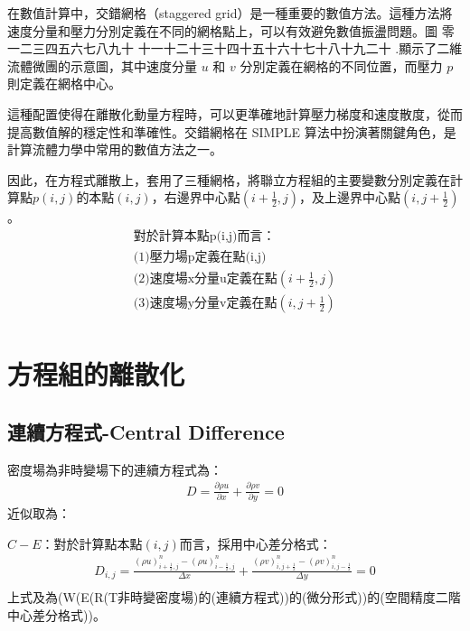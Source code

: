 \documentclass[12pt]{article}
\newcommand{\chinese}[1]{%
  \ifcase#1 零\or 一\or 二\or 三\or 四\or 五\or 六\or 七\or 八\or 九\or 十\or
  十一\or 十二\or 十三\or 十四\or 十五\or 十六\or 十七\or 十八\or 十九\or 二十\fi
}
\renewcommand{\thefigure}{\chinese{\value{section}}.\arabic{figure}}
\begin{document}
在數值計算中，交錯網格（staggered grid）是一種重要的數值方法。這種方法將速度分量和壓力分別定義在不同的網格點上，可以有效避免數值振盪問題。圖\thefigure 顯示了二維流體微團的示意圖，其中速度分量 $u$ 和 $v$ 分別定義在網格的不同位置，而壓力 $p$ 則定義在網格中心。

這種配置使得在離散化動量方程時，可以更準確地計算壓力梯度和速度散度，從而提高數值解的穩定性和準確性。交錯網格在 SIMPLE 算法中扮演著關鍵角色，是計算流體力學中常用的數值方法之一。

\noindent 因此，在方程式離散上，套用了三種網格，將聯立方程組的主要變數分別定義在計算點$p(i,j)$的本點$(i,j)$，右邊界中心點$(i+\frac{1}{2},j)$，及上邊界中心點$(i,j+\frac{1}{2})$。
\[
\begin{array}{l}
    \text{對於計算本點p(i,j)而言：}\\[1.5ex]
    \text{(1)壓力場p定義在點(i,j)}\\[1.5ex]
    \text{(2)速度場x分量u定義在點$(i+\frac{1}{2},j)$}\\[1.5ex]
    \text{(3)速度場y分量v定義在點$(i,j+\frac{1}{2})$}\\[1.5ex]
\end{array}
\]
\section{方程組的離散化}
\subsection{連續方程式-Central Difference}
\noindent 密度場為非時變場下的連續方程式為：
\begin{equation}\begin{split}
    D = \frac{\partial \rho u }{\partial x} + \frac{\partial\rho v }{\partial y} = 0
\end{split}\end{equation}
\noindent 近似取為：

\noindent $C-E$：對於計算點本點$(i,j)$而言，採用中心差分格式：
\begin{equation}\begin{split}
    D_{i,j} = \frac{(\rho u)_{i+\frac{1}{2},j}^{n} - (\rho u)_{i-\frac{1}{2},j}^{n}}{\Delta x} + \frac{(\rho v)_{i,j+\frac{1}{2}}^{n} - (\rho v)_{i,j-\frac{1}{2}}^{n}}{\Delta y} = 0 \\
\end{split}\end{equation}
\noindent 上式及為(W(E(R(T非時變密度場)的(連續方程式))的(微分形式))的(空間精度二階中心差分格式))。
\end{document}
